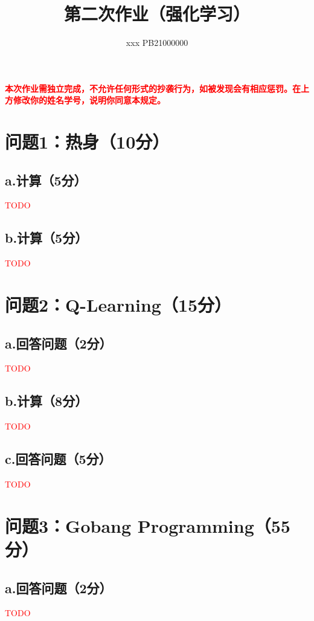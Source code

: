 \documentclass{article}
\title{\bfseries 第二次作业（强化学习）}
\author{xxx  \quad  PB21000000}
\begin{document}
\maketitle
\textcolor{red}{\textbf{本次作业需独立完成，不允许任何形式的抄袭行为，如被发现会有相应惩罚。在上方修改你的姓名学号，说明你同意本规定。}}

\section*{问题1：热身（10分）}
\subsection*{a.计算（5分）}
\textcolor{red}{TODO}

\subsection*{b.计算（5分）}
\textcolor{red}{TODO}



\section*{问题2：Q-Learning（15分）}
\subsection*{a.回答问题（2分）}
\textcolor{red}{TODO} 

\subsection*{b.计算（8分）}
\textcolor{red}{TODO}

\subsection*{c.回答问题（5分）}
\textcolor{red}{TODO}


\section*{问题3：Gobang Programming（55分）}
\subsection*{a.回答问题（2分）}
\textcolor{red}{TODO}
\end{document}
